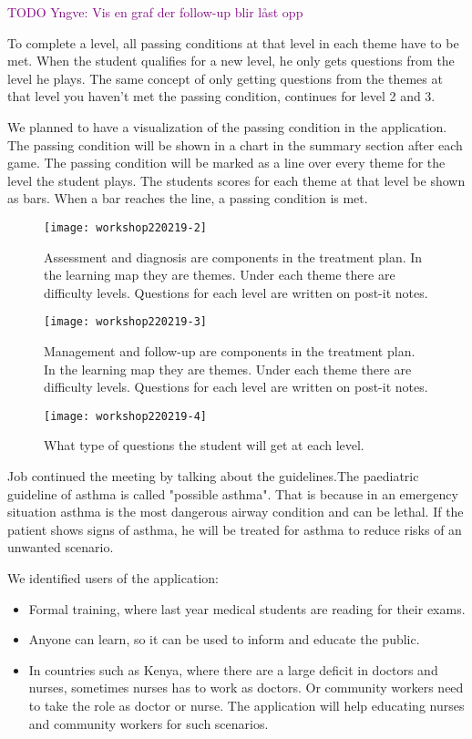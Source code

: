 \textcolor{purple}{TODO Yngve: Vis en graf der follow-up blir låst opp}

To complete a level, all passing conditions at that level in each theme have to be met. When the student qualifies for a new level, he only gets questions from the level he plays. The same concept of only getting questions from the themes at that level you haven't met the passing condition, continues for level 2 and 3. 

We planned to have a visualization of the passing condition in the application. The passing condition will be shown in a chart in the summary section after each game. The passing condition will be marked as a line over every theme for the level the student plays. The students scores for each theme at that level be shown as bars. When a bar reaches the line, a passing condition is met.




\begin{figure}[h!]
	\caption {Assessment and diagnosis are components in the treatment plan. In the learning map they are themes. Under each theme there are difficulty levels. Questions for each level are written on post-it notes.}
	\texttt{[image: workshop220219-2]}
\end{figure}

\begin{figure}[h!]
	\caption {Management and follow-up are components in the treatment plan. In the learning map they are themes. Under each theme there are difficulty levels. Questions for each level are written on post-it notes.}
	\texttt{[image: workshop220219-3]}
\end{figure}

\begin{figure}[h!]
	\caption {What type of questions the student will get at each level.}
	\texttt{[image: workshop220219-4]}
\end{figure}

Job continued the meeting by talking about the guidelines.The paediatric guideline of asthma is called "possible asthma". That is because in an emergency situation asthma is the most dangerous airway condition and can be lethal. If the patient shows signs of asthma, he will be treated for asthma to reduce risks of an unwanted scenario.

We identified users of the application: 
\begin{itemize}
	\item Formal training, where last year medical students are reading for their exams.
	\item Anyone can learn, so it can be used to inform and educate the public.
	\item In countries such as Kenya, where there are a large deficit in doctors and nurses, sometimes nurses has to work as doctors. Or community workers need to take the role as doctor or nurse. The application will help educating nurses and community workers for such scenarios.
\end{itemize}
 
